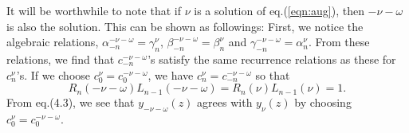 It will be worthwhile to note that  if $\nu$ is a solution 
of eq.(\ref{eqn:aug}), then $-\nu-\omega$ is also the solution. This 
can be shown as followings: First, we notice the algebraic relations,   
$\alpha^{-\nu-\omega}_{-n}=\gamma^\nu_n$, 
$\beta^{-\nu-\omega}_{-n}=\beta^\nu_n$ and 
$\gamma^{-\nu-\omega}_{-n}=\alpha^\nu_n$. From these relations, 
we find that  $c^{-\nu-\omega}_{-n}$'s 
satisfy the same recurrence relations as these for $c^\nu_n$'s. 
If we choose $c^\nu_0=c^{-\nu-\omega}_0$, we have 
$c^\nu_n=c^{-\nu-\omega}_{-n}$ so that 
%
\begin{equation}
R_n(-\nu-\omega) L_{n-1}(-\nu-\omega)=
R_n(\nu) L_{n-1}(\nu)= 1.
\end{equation}
%
From eq.(4.3), we see that $y_{-\nu-\omega}(z)$ agrees with $y_{\nu}(z)$ 
by choosing $c^\nu_0=c^{-\nu-\omega}_0$. 
 

